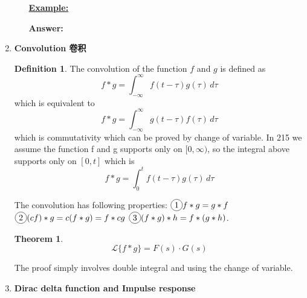 \documentclass[9pt]{article}
\theoremstyle{definition}
\newtheorem{definition}{Definition}
\newcommand*\circled[1]{\tikz[baseline=(char.base)]{
            \node[shape=circle,draw,inner sep=2pt] (char) {#1};}}
\newenvironment{changemargin}[2]{%
  \begin{list}{}{%
    \setlength{\topsep}{0pt}%
    \setlength{\leftmargin}{#1}%
    \setlength{\rightmargin}{#2}%
    \setlength{\listparindent}{\parindent}%
    \setlength{\itemindent}{\parindent}%
    \setlength{\parsep}{\parskip}%
  }%
  \item[]}{\end{list}}
\theoremstyle{theorem}
\newtheorem{theorem}{Theorem}
\theoremstyle{remark}
\theoremstyle{lemma}
\begin{document}
\begin{changemargin}{-0.125in}{0in}
\begin{enumerate}
\begin{enumerate}
        \medskip
        
        \underline{\textbf{Example:}} 
        
        \medskip
        
        \textbf{Answer: }
       
        
        \medskip
        
        
        \end{enumerate}
        
        \item \textbf{Convolution 卷积}
        
        \begin{definition}
        	The convolution of the function $f$ and $g$ is defined as 
        	\[
        	f*g  = \int_{-\infty}^\infty f(t - \tau) g(\tau) \, d\tau
        	\]
        	which is equivalent to 
        	\[
        	f*g  = \int_{-\infty}^\infty g(t - \tau) f(\tau) \, d\tau
        	\]
        	which is commutativity which can be proved by change of variable. In 215 we assume the function f and g supports only on $[0,\infty)$, so the integral above supports only on $[0,t]$ which is 
        	\[
        	f*g  = \int_{0}^t f(t - \tau) g(\tau) \, d\tau
        	\]
        \end{definition}
        The convolution has following properties: $\circled{1} f * g = g * f$ $\circled{2} (cf) * g = c(f * g) = f * cg$ $\circled{3} (f * g) * h = f * (g * h)$.
        
        \medskip
        
        \begin{theorem}
        	\[
        	\mathcal{L}\{f * g\} = F(s) \cdot G(s)
        	\]
        \end{theorem}
        The proof simply involves double integral and using the change of variable. 
        
        \medskip
        
        \item \textbf{Dirac delta function and Impulse response}
        
        \medskip
        

\end{enumerate}
\end{changemargin}
\end{document}
